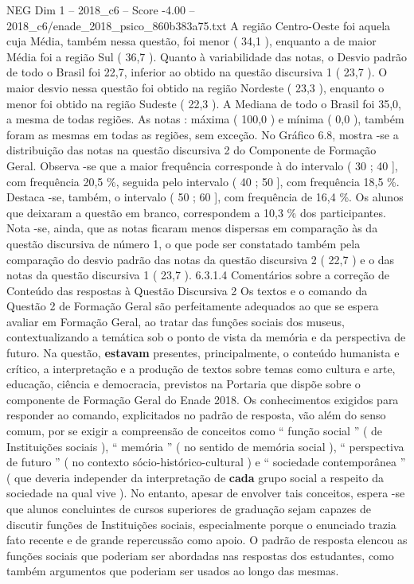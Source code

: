\begin{textsample}{NEG Dim 1 – 2018\_c6 – Score -4.00 – 2018\_c6/enade\_2018\_psico\_860b383a75.txt}
A região Centro-Oeste foi aquela cuja Média, também nessa questão, foi menor ( 34,1 ), enquanto a de maior Média foi a região Sul ( 36,7 ).
Quanto à variabilidade das notas, o Desvio padrão de todo o Brasil foi 22,7, inferior ao obtido na questão discursiva 1 ( 23,7 ).
O maior desvio nessa questão foi obtido na região Nordeste ( 23,3 ), enquanto o menor foi obtido na região Sudeste ( 22,3 ).
A Mediana de todo o Brasil foi 35,0, a mesma de todas regiões.
As notas : máxima ( 100,0 ) e mínima ( 0,0 ), também foram as mesmas em todas as regiões, sem exceção.
No Gráfico 6.8, mostra -se a distribuição das notas na questão discursiva 2 do Componente de Formação Geral.
Observa -se que a maior frequência corresponde à do intervalo ( 30 ; 40 ], com frequência 20,5 \%, seguida pelo intervalo ( 40 ; 50 ], com frequência 18,5 \%.
Destaca -se, também, o intervalo ( 50 ; 60 ], com frequência de 16,4 \%.
Os alunos que deixaram a questão em branco, correspondem a 10,3 \% dos participantes.
Nota -se, ainda, que as notas ficaram menos dispersas em comparação às da questão discursiva de número 1, o que pode ser constatado também pela comparação do desvio padrão das notas da questão discursiva 2 ( 22,7 ) e o das notas da questão discursiva 1 ( 23,7 ). 6.3.1.4 Comentários sobre a correção de Conteúdo das respostas à Questão Discursiva 2 Os textos e o comando da Questão 2 de Formação Geral são perfeitamente adequados ao que se espera avaliar em Formação Geral, ao tratar das funções sociais dos museus, contextualizando a temática sob o ponto de vista da memória e da perspectiva de futuro.
Na questão, \textbf{estavam} presentes, principalmente, o conteúdo humanista e crítico, a interpretação e a produção de textos sobre temas como cultura e arte, educação, ciência e democracia, previstos na Portaria que dispõe sobre o componente de Formação Geral do Enade 2018.
Os conhecimentos exigidos para responder ao comando, explicitados no padrão de resposta, vão além do senso comum, por se exigir a compreensão de conceitos como “ função social ” ( de Instituições sociais ), “ memória ” ( no sentido de memória social ), “ perspectiva de futuro ” ( no contexto sócio-histórico-cultural ) e “ sociedade contemporânea ” ( que deveria independer da interpretação de \textbf{cada} grupo social a respeito da sociedade na qual vive ).
No entanto, apesar de envolver tais conceitos, espera -se que alunos concluintes de cursos superiores de graduação sejam capazes de discutir funções de Instituições sociais, especialmente porque o enunciado trazia fato recente e de grande repercussão como apoio.
O padrão de resposta elencou as funções sociais que poderiam ser abordadas nas respostas dos estudantes, como também argumentos que poderiam ser usados ao longo das mesmas.

\end{textsample}
